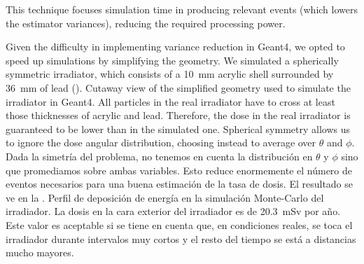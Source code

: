 This technique focuses simulation time in producing relevant events
(which lowers the estimator variances),
reducing the required processing power.

Given the difficulty in implementing variance reduction in Geant4,
we opted to speed up simulations by simplifying the geometry.
We simulated a spherically symmetric irradiator,
which consists of a \SI{10}{\milli\meter} acrylic shell 
surrounded by \SI{36}{\milli\meter} of lead (). 
{Cutaway view of the simplified geometry used to simulate the irradiator in Geant4.}
All particles in the real irradiator have to cross at least those thicknesses of acrylic and lead.
Therefore, the dose in the real irradiator is guaranteed to be lower than in the simulated one.
Spherical symmetry allows us to ignore the dose angular distribution,
choosing instead to average over $\theta$ and $\phi$.
Dada la simetría del problema, no tenemos en cuenta la distribución en
$\theta$ y $\phi$ sino que promediamos sobre ambas variables.
Esto reduce enormemente el número de eventos necesarios para una buena
estimación de la tasa de dosis.
El resultado se ve en la .
{Perfil de deposición de energía en la simulación Monte-Carlo del irradiador.}
La dosis en la cara exterior del irradiador es
de \SI{20.3}{\milli\sievert} por año.
Este valor es aceptable si se tiene en cuenta que,
en condiciones reales, se toca el irradiador durante intervalos muy cortos
y el resto del tiempo se está a distancias mucho mayores.
